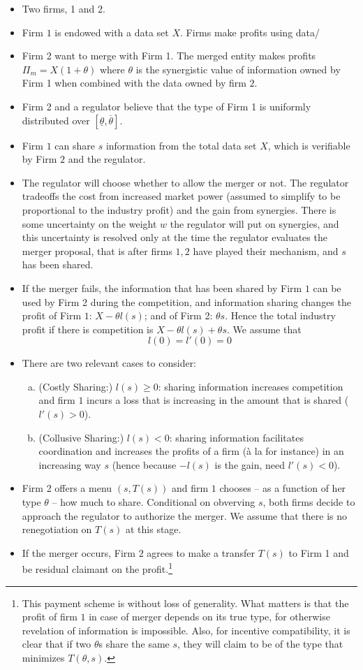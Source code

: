 \documentclass[a4paper]{article}
\renewcommand{\t}{\theta}
\begin{document}
\begin{itemize}\setlength\itemsep{0em}
	\item Two firms, 1 and 2. 
	\item Firm $1$ is endowed with a data set $X$. Firms make profits using data/ 
	\item Firm 2 want to merge with Firm 1. The merged entity makes profits $\Pi_m=X(1+\t)$ where $\t$ is the synergistic value of information owned by Firm 1 when combined with the data owned by firm $2$. 
	\item Firm 2 and a regulator believe that the type of Firm 1 is uniformly distributed over $[\underline{\t},\overline{\t}]$.
    \item Firm $1$ can share $s$ information from the total data set $X$, which is verifiable by Firm $2$ and the regulator.
	\item The regulator will choose whether to allow the merger or not. The regulator tradeoffs the cost from increased market power (assumed to simplify to be proportional to the industry profit) and the gain from synergies. There is some uncertainty on the weight $w$ the regulator will put on synergies, and this uncertainty is resolved only at the time the regulator evaluates the merger proposal, that is after firms $1,2$ have played their mechanism, and $s$ has been shared.
	\item If the merger fails, the information that has been shared by Firm $1$ can be used by Firm 2 during the competition, and information sharing changes the profit of Firm $1$: $X-\theta l(s)$; and of Firm 2: $\t s$. Hence the total industry profit if there is competition is $X-\t l(s)+\t s$. We assume that
    \[
        l(0)=l'(0)=0
    \]
	\item There are two relevant cases to consider:
\begin{enumerate}[(a)]
    \item (Costly Sharing:) $l(s)\geq 0$: sharing information increases competition and firm $1$ incurs a loss that is increasing in the amount that is shared ($l'(s)>0$).
    \item (Collusive Sharing:) $l(s)< 0$: sharing information facilitates coordination and increases the profits of a firm (à la \cite{vives1984duopoly} for instance) in an increasing way $s$ (hence because $-l(s)$ is the gain, need $l'(s)<0$).
 \end{enumerate}
    \item Firm 2 offers a menu $(s,T(s))$ and firm $1$ chooses -- as a function of her type $\theta$ -- how much to share. Conditional on obverving $s$, both firms decide to approach the regulator to authorize the merger. We assume that there is no renegotiation on $T(s)$ at this stage.
    \item If the merger occurs, Firm $2$ agrees to make a transfer  $T(s)$ to Firm 1 and be residual claimant on the profit.\footnote{%
    This payment scheme is without loss of generality. What matters is that the profit of firm $1$ in case of merger depends on its true type, for otherwise revelation of information is impossible. Also, for incentive compatibility, it is clear that if two $\theta$s share the same $s$, they will claim to be of the type that minimizes $T(\theta,s)$.}
    

\end{itemize}
\end{document}
